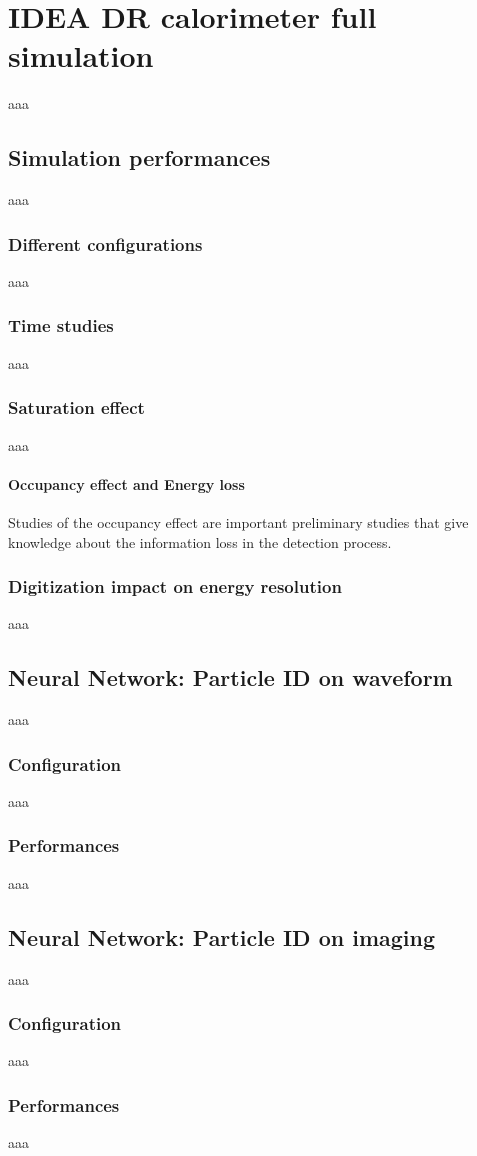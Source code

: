 \chapter{IDEA DR calorimeter full simulation}
aaa


\section{Simulation performances}
aaa

\subsection{Different configurations}
aaa

\subsection{Time studies}
aaa

\subsection{Saturation effect}
aaa

\subsubsection{Occupancy effect and Energy loss}
Studies of the occupancy effect are important preliminary studies that give knowledge about the information loss in the detection process.\\

\subsection{Digitization impact on energy resolution}
aaa

\section{Neural Network: Particle ID on waveform}
aaa

\subsection{Configuration}
aaa

\subsection{Performances}
aaa

\section{Neural Network: Particle ID on imaging}
aaa

\subsection{Configuration}
aaa

\subsection{Performances}
aaa